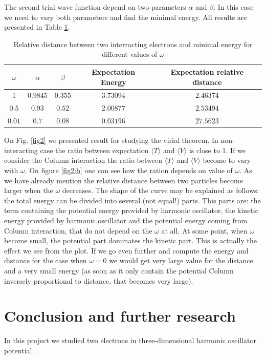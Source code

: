 \documentclass[10pt]{article}
\begin{document}
The second trial wave function depend on two parameters $\alpha$ and $\beta$. In this case we need to vary both parameters and find the minimal energy. All results are presented in Table \ref{tab:two}.
 
\begin{table}[h!]
  \caption{Relative distance between two interracting electrons and minimal energy for different values of $\omega$}
  \label{tab:two}
  \begin{center}
    \begin{tabular}{c|c|c|c|c}
    \hline
		$\omega$ & $\alpha$& $\beta$ & Expectation Energy & Expectation relative distance \\
    \hline
	$	1 $  & $0.9845$& $0.355$ & $3.73094$ & $2.46374$  \\
	$	0.5$  & $0.93$ & $0.52$ & $2.00877$ & $2.53494$   \\
	$	0.01$  & $0.7$ & $0.08$ & $0.03196$ & $27.5623$   \\
	\end{tabular}
  \end{center}
\end{table}


On Fig. \ref{fig2} we presented result for studying the virial theorem. In non-interacting case the ratio between expectation  $\langle T \rangle$  and   $\langle V \rangle$ is close to 1. If we consider the Column interaction the ratio between  $\langle T \rangle$  and   $\langle V \rangle$ become to vary with $\omega$. On figure \ref{fig2:b} one can see how the ration depends on value of $\omega$. As we have already mention the relative distance between two particles become larger when the $\omega$ decreases. The shape of the curve may be explained as follows: the total energy can be divided into several (not equal!) parts. This parts are: the term containing the potential energy provided by harmonic oscillator, the kinetic energy provided by harmonic oscillator and the potential energy coming from Column interaction, that do not depend on the $\omega$ at all. At some point, when $\omega$ become small, the potential part dominates the kinetic part. This is actually the effect we see from the plot. If we go even further and compute the energy and distance for the case when $\omega =0$ we would get very large value for the distance and a very small energy (as soon as it only contain the potential Column inversely proportional to distance, that becomes very large).

\newpage
\clearpage
\section{Conclusion and further research}\label{conc}
In this project we studied two electrons in three-dimensional harmonic oscillator potential.
\end{document}
